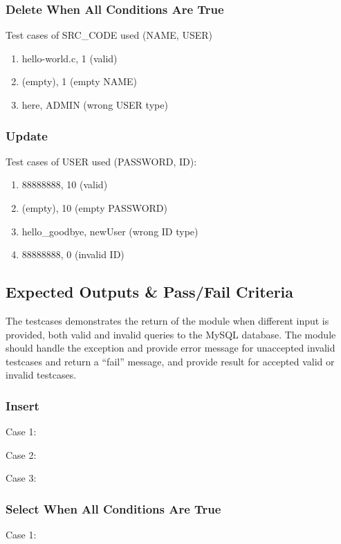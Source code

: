 \subsubsection{Delete When All Conditions Are True}
Test cases of SRC\_CODE used (NAME, USER)
\begin{enumerate}
  \item hello-world.c, 1 (valid)
  \item (empty), 1 (empty NAME)
  \item here, ADMIN (wrong USER type)
\end{enumerate}

\subsubsection{Update}
Test cases of USER used (PASSWORD, ID):
\begin{enumerate}
  \item 88888888, 10 (valid)
  \item (empty), 10 (empty PASSWORD)
  \item hello\_goodbye, newUser (wrong ID type)
  \item 88888888, 0 (invalid ID)
\end{enumerate}

\subsection{Expected Outputs \& Pass/Fail Criteria}
The testcases demonstrates the return of the module when different input is provided, both valid and invalid queries to the MySQL database. The module should handle the exception and provide error message for unaccepted invalid testcases and return a ``fail'' message, and provide result for accepted valid or invalid testcases.
\subsubsection{Insert}
Case 1:


Case 2:


Case 3:


\subsubsection{Select When All Conditions Are True}
Case 1:


